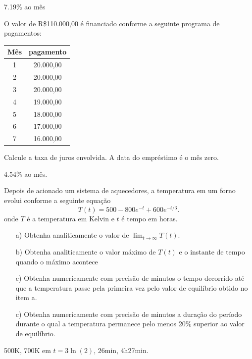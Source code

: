 \documentclass[main.tex]{subfiles}
\begin{document}
\begin{Answer}
7.19\% ao mês
\end{Answer}

\begin{Exercise}[title= Matemática financeira] O valor de R\$110.000,00 é financiado conforme a seguinte programa de pagamentos:

\begin{tabular}{|c|c|}
\hline
Mês & pagamento\\
\hline
1&20.000,00\\
2&20.000,00\\
3&20.000,00\\
4&19.000,00\\
5&18.000,00\\
6&17.000,00\\
7&16.000,00\\
\hline	
\end{tabular}

Calcule a taxa de juros envolvida. A data do empréstimo é o mês zero.
 \end{Exercise}

\begin{Answer}
4.54\% ao mês.
\end{Answer}


\begin{Exercise}[title=Controle de sistemas]  Depois de acionado um sistema de aquecedores, a temperatura em um forno  evolui conforme a seguinte equação
$$T(t)=500-800e^{-t}+600e^ {-t/3}.$$
onde $T$ é a temperatura em Kelvin e $t$ é tempo em horas.
\begin{itemize}
\item[a)] Obtenha analiticamente o valor de $\lim_{t\to\infty}T(t)$.
\item[b)] Obtenha analiticamente o valor máximo de $T(t)$ e o instante de tempo quando o máximo acontece
\item[c)] Obtenha numericamente com precisão de minutos o tempo decorrido até que a temperatura passe pela primeira vez pelo valor de equilíbrio obtido no item a.
\item[c)] Obtenha numericamente com precisão de minutos a duração do período durante o qual a temperatura permanece pelo menos 20\% superior ao valor de equilíbrio.
\end{itemize}
\end{Exercise}

\begin{Answer}
500K, 700K em $t=3\ln(2)$, 26min, 4h27min.
\end{Answer}
\end{document}
